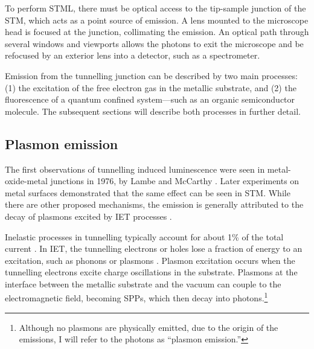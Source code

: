 To perform \ac{STML}, there must be optical access to the tip-sample junction of the \ac{STM}, which acts as a point source of emission. A lens mounted to the microscope head is focused at the junction, collimating the emission. An optical path through several windows and viewports allows the photons to exit the microscope and be refocused by an exterior lens into a detector, such as a spectrometer. 


Emission from the tunnelling junction can be described by two main processes: (1) the excitation of the free electron gas in the metallic substrate, and (2) the fluorescence of a quantum confined system---such as an organic semiconductor molecule. The subsequent sections will describe both processes in further detail. 


\subsection{Plasmon emission}

The first observations of tunnelling induced luminescence were seen in metal-oxide-metal junctions in 1976, by Lambe and McCarthy \citep{lambe1976light}. Later experiments on metal surfaces \citep{berndt1991inelastic, ushioda1992stm, hoffmann2002color} demonstrated that the same effect can be seen in \ac{STM}. While there are other proposed mechanisms, the emission is generally attributed to the decay of plasmons excited by \acf{IET} processes \citep{berndt1991inelastic}.

Inelastic processes in tunnelling typically account for about 1\% of the total current \citep{novotny2012principles}. In \ac{IET}, the tunnelling electrons or holes lose a fraction of energy to an excitation, such as phonons or plasmons  \citep{vitali2004phonon}. Plasmon excitation occurs when the tunnelling electrons excite charge oscillations in the substrate. Plasmons at the interface between the metallic substrate and the vacuum can couple to the electromagnetic field, becoming \acp{SPP}, which then decay into photons.\footnote{Although no plasmons are physically emitted, due to the origin of the emissions, I will refer to the photons as ``plasmon emission.''} 

